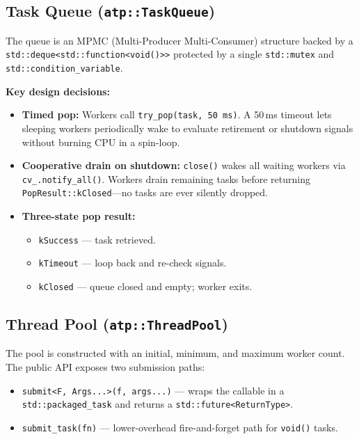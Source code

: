 \documentclass[12pt,a4paper]{article}
\begin{document}
\subsection{Task Queue (\texttt{atp::TaskQueue})}

The queue is an MPMC (Multi-Producer Multi-Consumer) structure backed by a
\texttt{std::deque<std::function<void()>>} protected by a single
\texttt{std::mutex} and \texttt{std::condition\_variable}.

\textbf{Key design decisions:}
\begin{itemize}
  \item \textbf{Timed pop:} Workers call \texttt{try\_pop(task, 50\,ms)}.
        A 50\,ms timeout lets sleeping workers periodically wake to evaluate
        retirement or shutdown signals without burning CPU in a spin-loop.
  \item \textbf{Cooperative drain on shutdown:} \texttt{close()} wakes all
        waiting workers via \texttt{cv\_.notify\_all()}.
        Workers drain remaining tasks before returning
        \texttt{PopResult::kClosed}---no tasks are ever silently dropped.
  \item \textbf{Three-state pop result:}
        \begin{itemize}
          \item \texttt{kSuccess} --- task retrieved.
          \item \texttt{kTimeout} --- loop back and re-check signals.
          \item \texttt{kClosed} --- queue closed and empty; worker exits.
        \end{itemize}
\end{itemize}

\subsection{Thread Pool (\texttt{atp::ThreadPool})}

The pool is constructed with an initial, minimum, and maximum worker count.
The public API exposes two submission paths:

\begin{itemize}
  \item \texttt{submit<F, Args...>(f, args...)} --- wraps the callable in a
        \texttt{std::packaged\_task} and returns a
        \texttt{std::future<ReturnType>}.
  \item \texttt{submit\_task(fn)} --- lower-overhead fire-and-forget path
        for \texttt{void()} tasks.
\end{itemize}
\end{document}
